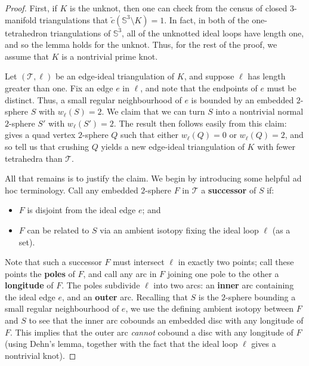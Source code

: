 \documentclass[a4paper,UKenglish,cleveref, autoref, thm-restate]{lipics-v2021}
\newcommand{\tri}{\mathcal{T}}
\begin{document}
\begin{proof}
First, if $K$ is the unknot, then one can check from the census of closed $3$-manifold triangulations that $\tilde{c}(\mathbb{S}^3\setminus K) = 1$.
In fact, in both of the one-tetrahedron triangulations of $\mathbb{S}^3$, all of the unknotted ideal loops have length one, and so the lemma holds for the unknot.
Thus, for the rest of the proof, we assume that $K$ is a nontrivial prime knot.

Let $(\tri,\ell)$ be an edge-ideal triangulation of $K$, and suppose $\ell$ has length greater than one.
Fix an edge $e$ in $\ell$, and note that the endpoints of $e$ must be distinct.
Thus, a small regular neighbourhood of $e$ is bounded by an embedded $2$-sphere $S$ with $w_\ell(S)=2$.
We claim that we can turn $S$ into a nontrivial normal $2$-sphere $S'$ with $w_\ell(S')=2$.
The result then follows easily from this claim:
 gives a quad vertex $2$-sphere $Q$ such that either $w_\ell(Q)=0$ or $w_\ell(Q)=2$,
and so  tell us that crushing $Q$ yields a new edge-ideal triangulation of $K$ with fewer tetrahedra than $\tri$.

All that remains is to justify the claim.
We begin by introducing some helpful ad hoc terminology.
Call any embedded $2$-sphere $F$ in $\tri$ a \textbf{successor} of $S$ if:
\begin{itemize}
\item
$F$ is disjoint from the ideal edge $e$; and
\item
$F$ can be related to $S$ via an ambient isotopy fixing the ideal loop $\ell$ (as a set).
\end{itemize}
Note that such a successor $F$ must intersect $\ell$ in exactly two points;
call these points the \textbf{poles} of $F$, and call any arc in $F$ joining one pole to the other a \textbf{longitude} of $F$.
The poles subdivide $\ell$ into two arcs:
an \textbf{inner} arc containing the ideal edge $e$, and an \textbf{outer} arc.
Recalling that $S$ is the $2$-sphere bounding a small regular neighbourhood of $e$,
we use the defining ambient isotopy between $F$ and $S$ to see that the inner arc cobounds an embedded disc with any longitude of $F$.
This implies that the outer arc \emph{cannot} cobound a disc with any longitude of $F$ (using Dehn's lemma, together with the fact that the ideal loop $\ell$ gives a nontrivial knot).


\end{proof}
\end{document}
